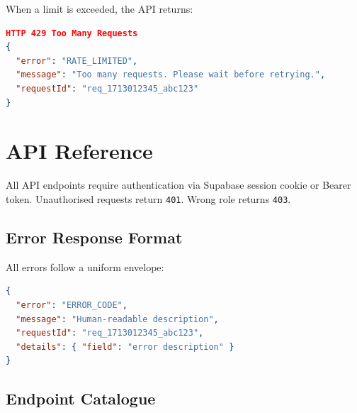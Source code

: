 \documentclass[11pt, a4paper]{article}
\begin{document}
When a limit is exceeded, the API returns:
\begin{lstlisting}[language=json]
HTTP 429 Too Many Requests
{
  "error": "RATE_LIMITED",
  "message": "Too many requests. Please wait before retrying.",
  "requestId": "req_1713012345_abc123"
}
\end{lstlisting}

\section{API Reference}

All API endpoints require authentication via Supabase session cookie or Bearer token. Unauthorised requests return \texttt{401}. Wrong role returns \texttt{403}.

\subsection{Error Response Format}

All errors follow a uniform envelope:

\begin{lstlisting}[language=json]
{
  "error": "ERROR_CODE",
  "message": "Human-readable description",
  "requestId": "req_1713012345_abc123",
  "details": { "field": "error description" }
}
\end{lstlisting}

\subsection{Endpoint Catalogue}
\end{document}
